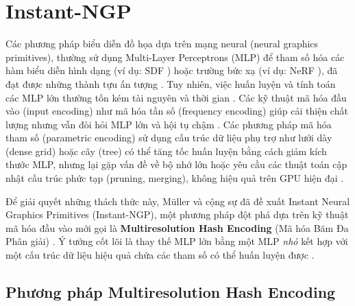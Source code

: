 \section{Instant-NGP}
Các phương pháp biểu diễn đồ họa dựa trên mạng neural (neural graphics primitives), thường sử dụng Multi-Layer Perceptrons (MLP) để tham số hóa các hàm biểu diễn hình dạng (ví dụ: SDF \cite{Park2019DeepSDF}) hoặc trường bức xạ (ví dụ: NeRF \cite{Mildenhall2020NeRF}), đã đạt được những thành tựu ấn tượng \cite{Muller2022InstantNGP}. Tuy nhiên, việc huấn luyện và tính toán các MLP lớn thường tốn kém tài nguyên và thời gian \cite{Muller2022InstantNGP_source_8}. Các kỹ thuật mã hóa đầu vào (input encoding) như mã hóa tần số (frequency encoding) \cite{Mildenhall2020NeRF, Vaswani2017Attention} giúp cải thiện chất lượng nhưng vẫn đòi hỏi MLP lớn và hội tụ chậm \cite{Muller2022InstantNGP_source_78}. Các phương pháp mã hóa tham số (parametric encoding) sử dụng cấu trúc dữ liệu phụ trợ như lưới dày (dense grid) hoặc cây (tree) \cite{Liu2020NSVF, Takikawa2021NGLOD} có thể tăng tốc huấn luyện bằng cách giảm kích thước MLP, nhưng lại gặp vấn đề về bộ nhớ lớn hoặc yêu cầu các thuật toán cập nhật cấu trúc phức tạp (pruning, merging), không hiệu quả trên GPU hiện đại \cite{Muller2022InstantNGP_source_26, Muller2022InstantNGP_source_28, Muller2022InstantNGP_source_55, Muller2022InstantNGP_source_74, Muller2022InstantNGP_source_81, Muller2022InstantNGP_source_92}.

Để giải quyết những thách thức này, Müller và cộng sự đã đề xuất Instant Neural Graphics Primitives (Instant-NGP), một phương pháp đột phá dựa trên kỹ thuật mã hóa đầu vào mới gọi là \textbf{Multiresolution Hash Encoding} (Mã hóa Băm Đa Phân giải) \cite{Muller2022InstantNGP}. Ý tưởng cốt lõi là thay thế MLP lớn bằng một MLP \textit{nhỏ} kết hợp với một cấu trúc dữ liệu hiệu quả chứa các tham số có thể huấn luyện được \cite{Muller2022InstantNGP_source_9}.

\subsection{Phương pháp Multiresolution Hash Encoding}

